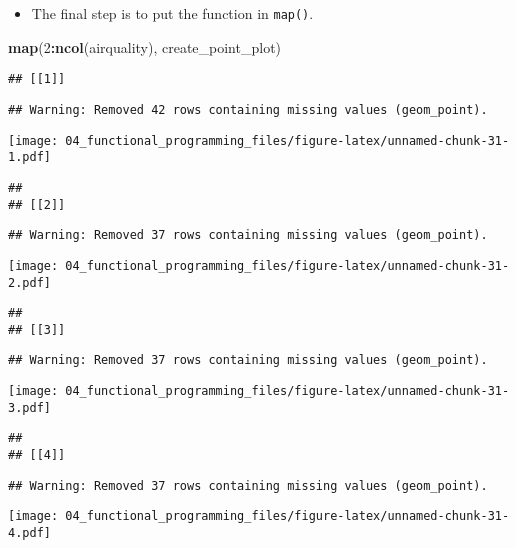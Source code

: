 \documentclass[
]{book}
\newenvironment{Shaded}{\begin{snugshade}}{\end{snugshade}}
\newcommand{\DecValTok}[1]{\textcolor[rgb]{0.00,0.00,0.81}{#1}}
\newcommand{\KeywordTok}[1]{\textcolor[rgb]{0.13,0.29,0.53}{\textbf{#1}}}
\newcommand{\NormalTok}[1]{#1}
\newcommand{\OperatorTok}[1]{\textcolor[rgb]{0.81,0.36,0.00}{\textbf{#1}}}
\providecommand{\tightlist}{%
  \setlength{\itemsep}{0pt}\setlength{\parskip}{0pt}}
\begin{document}
\begin{itemize}
\tightlist
\item
  The final step is to put the function in \texttt{map()}.
\end{itemize}

\begin{Shaded}
\begin{Highlighting}[]
\KeywordTok{map}\NormalTok{(}\DecValTok{2}\OperatorTok{:}\KeywordTok{ncol}\NormalTok{(airquality), create\_point\_plot)}
\end{Highlighting}
\end{Shaded}

\begin{verbatim}
## [[1]]
\end{verbatim}

\begin{verbatim}
## Warning: Removed 42 rows containing missing values (geom_point).
\end{verbatim}

\texttt{[image: 04\_functional\_programming\_files/figure-latex/unnamed-chunk-31-1.pdf]}

\begin{verbatim}
## 
## [[2]]
\end{verbatim}

\begin{verbatim}
## Warning: Removed 37 rows containing missing values (geom_point).
\end{verbatim}

\texttt{[image: 04\_functional\_programming\_files/figure-latex/unnamed-chunk-31-2.pdf]}

\begin{verbatim}
## 
## [[3]]
\end{verbatim}

\begin{verbatim}
## Warning: Removed 37 rows containing missing values (geom_point).
\end{verbatim}

\texttt{[image: 04\_functional\_programming\_files/figure-latex/unnamed-chunk-31-3.pdf]}

\begin{verbatim}
## 
## [[4]]
\end{verbatim}

\begin{verbatim}
## Warning: Removed 37 rows containing missing values (geom_point).
\end{verbatim}

\texttt{[image: 04\_functional\_programming\_files/figure-latex/unnamed-chunk-31-4.pdf]}
\end{document}
